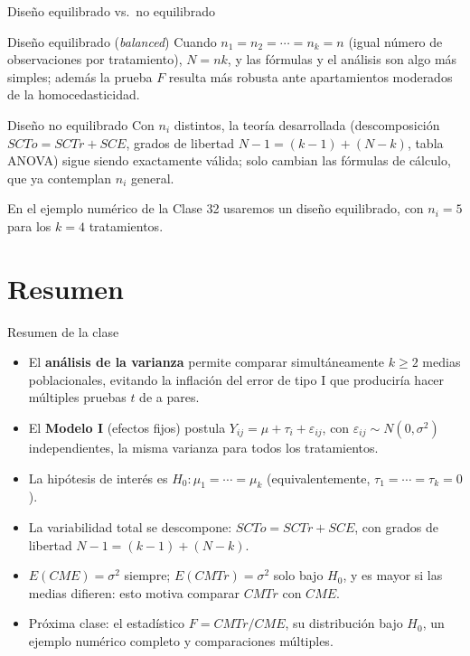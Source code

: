 \documentclass[aspectratio=169,11pt]{beamer}
\begin{document}
\begin{frame}{Diseño equilibrado vs.\ no equilibrado}
\begin{block}{Diseño equilibrado (\emph{balanced})}
Cuando $n_1=n_2=\cdots=n_k=n$ (igual número de observaciones por tratamiento), $N=nk$, y las fórmulas y el análisis son algo más simples; además la prueba $F$ resulta más robusta ante apartamientos moderados de la homocedasticidad.
\end{block}

\begin{block}{Diseño no equilibrado}
Con $n_i$ distintos, la teoría desarrollada (descomposición $SCTo=SCTr+SCE$, grados de libertad $N-1=(k-1)+(N-k)$, tabla ANOVA) sigue siendo exactamente válida; solo cambian las fórmulas de cálculo, que ya contemplan $n_i$ general.
\end{block}

En el ejemplo numérico de la Clase 32 usaremos un diseño equilibrado, con $n_i=5$ para los $k=4$ tratamientos.
\end{frame}

\section{Resumen}

\begin{frame}{Resumen de la clase}
\begin{itemize}
\item El \textbf{análisis de la varianza} permite comparar simultáneamente $k\geq 2$ medias poblacionales, evitando la inflación del error de tipo I que produciría hacer múltiples pruebas $t$ de a pares.
\item El \textbf{Modelo I} (efectos fijos) postula $Y_{ij}=\mu+\tau_i+\varepsilon_{ij}$, con $\varepsilon_{ij}\sim N(0,\sigma^2)$ independientes, la misma varianza para todos los tratamientos.
\item La hipótesis de interés es $H_0:\mu_1=\cdots=\mu_k$ (equivalentemente, $\tau_1=\cdots=\tau_k=0$).
\item La variabilidad total se descompone: $SCTo = SCTr + SCE$, con grados de libertad $N-1=(k-1)+(N-k)$.
\item $E(CME)=\sigma^2$ siempre; $E(CMTr)=\sigma^2$ solo bajo $H_0$, y es mayor si las medias difieren: esto motiva comparar $CMTr$ con $CME$.
\item Próxima clase: el estadístico $F=CMTr/CME$, su distribución bajo $H_0$, un ejemplo numérico completo y comparaciones múltiples.
\end{itemize}
\end{frame}
\end{document}
